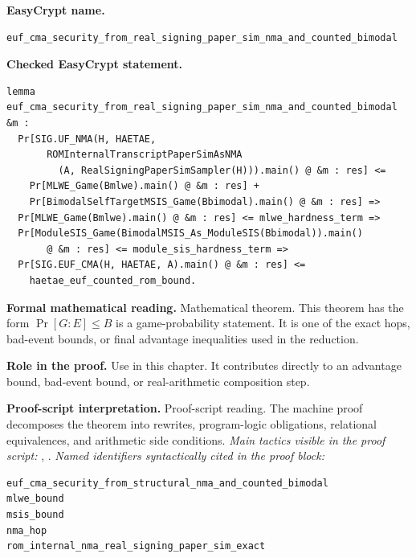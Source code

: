 \begin{formaltheorem}
\noindent\textbf{EasyCrypt name.}
\begin{lstlisting}[language=EasyCrypt,basicstyle=\ttfamily\scriptsize]
euf_cma_security_from_real_signing_paper_sim_nma_and_counted_bimodal
\end{lstlisting}
\noindent\textbf{Checked EasyCrypt statement.}
\begin{lstlisting}[language=EasyCrypt,basicstyle=\ttfamily\scriptsize]
lemma euf_cma_security_from_real_signing_paper_sim_nma_and_counted_bimodal &m :
  Pr[SIG.UF_NMA(H, HAETAE,
       ROMInternalTranscriptPaperSimAsNMA
         (A, RealSigningPaperSimSampler(H))).main() @ &m : res] <=
    Pr[MLWE_Game(Bmlwe).main() @ &m : res] +
    Pr[BimodalSelfTargetMSIS_Game(Bbimodal).main() @ &m : res] =>
  Pr[MLWE_Game(Bmlwe).main() @ &m : res] <= mlwe_hardness_term =>
  Pr[ModuleSIS_Game(BimodalMSIS_As_ModuleSIS(Bbimodal)).main()
       @ &m : res] <= module_sis_hardness_term =>
  Pr[SIG.EUF_CMA(H, HAETAE, A).main() @ &m : res] <=
    haetae_euf_counted_rom_bound.
\end{lstlisting}
\noindent\textbf{Formal mathematical reading.}
Mathematical theorem. This theorem has the form \(\Pr[G:E] \le B\) is a game-probability statement.  It is one of the exact hops, bad-event bounds, or final advantage inequalities used in the reduction.

\noindent\textbf{Role in the proof.}
Use in this chapter. It contributes directly to an advantage bound, bad-event bound, or real-arithmetic composition step.

\noindent\textbf{Proof-script interpretation.}
Proof-script reading. The machine proof decomposes the theorem into rewrites, program-logic obligations, relational equivalences, and arithmetic side conditions.
\emph{Main tactics visible in the proof script:} , .
\emph{Named identifiers syntactically cited in the proof block:}
\begin{lstlisting}[language=EasyCrypt,basicstyle=\ttfamily\scriptsize]
euf_cma_security_from_structural_nma_and_counted_bimodal
mlwe_bound
msis_bound
nma_hop
rom_internal_nma_real_signing_paper_sim_exact
\end{lstlisting}

\end{formaltheorem}

